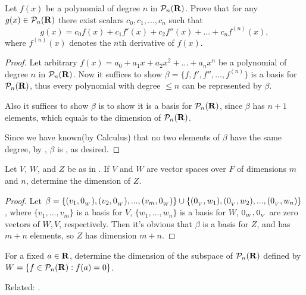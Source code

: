 \begin{exercise} \label{exercise 1.6.24}
Let \(f(x)\) be a polynomial of degree \(n\) in \(\mathcal{P}_n(\mathbf{R})\).
Prove that for any \(g(x) \in \mathcal{P}_n(\mathbf{R})\) there exist scalars \(c_0, c_1, ..., c_n\) such that
\[
    g(x) = c_0 f(x) + c_1 f'(x) + c_2 f''(x) + ... + c_n f^{(n)}(x),
\]
where \(f^{(n)}(x)\) denotes the \(n\)th derivative of \(f(x)\).
\end{exercise}

\begin{proof}
Let arbitrary \(f(x) = a_0 + a_1 x + a_2 x^2 + ... + a_n x^n\) be a polynomial of degree \(n\) in \(\mathcal{P}_n(\mathbf{R})\).
Now it suffices to show \(\beta = \{ f, f', f'', ..., f^{(n)} \}\) is a basis for \(\mathcal{P}_n(\mathbf{R})\), thus every polynomial with degree \(\le n\) can be represented by \(\beta\).

Also it suffices to show \(\beta\) is \LID{} to show it is a basis for \(\mathcal{P}_n(\mathbf{R})\), since \(\beta\) has \(n + 1\) elements, which equals to the dimension of \(\mathcal{P}_n(\mathbf{R})\).

Since we have known(by Calculus) that no two elements of \(\beta\) have the same degree, by , \(\beta\) is \LID{}, as desired.
\end{proof}

\begin{exercise} \label{exercise 1.6.25}
Let \(V\), \(W\), and \(Z\) be as in .
If \(V\) and \(W\) are vector spaces over \(F\) of dimensions \(m\) and \(n\), determine the dimension of \(Z\).
\end{exercise}

\begin{proof}
\sloppy Let \(\beta = \{ (v_1, 0_{_W}), (v_2, 0_{_W}), ..., (v_m, 0_{_W}) \} \cup \{ (0_{_V}, w_1), (0_{_V}, w_2), ..., (0_{_V}, w_n) \}\),
where \(\{ v_1, ..., v_m \}\) is a basis for \(V\), \(\{ w_1, ..., w_n \}\) is a basis for \(W\), \(0_{_W}, 0_{_V}\) are zero vectors of \(W, V\), respectively.
Then it's obvious that \(\beta\) is a basis for \(Z\), and has \(m + n\) elements, so \(Z\) has dimension \(m + n\).
\end{proof}

\begin{exercise} \label{exercise 1.6.26}
For a fixed \(a \in \mathbf{R}\), determine the dimension of the subspace of \(\mathcal{P}_n(\mathbf{R})\) defined by \(W = \{ f \in \mathcal{P}_n(\mathbf{R}) : f(a) = 0 \}\).

Related: .
\end{exercise}

